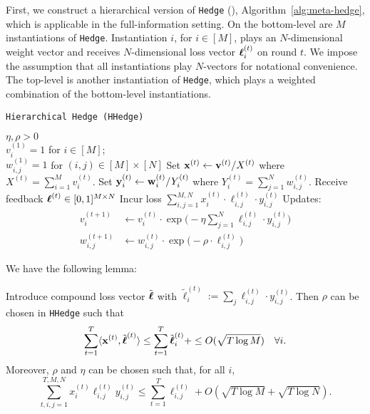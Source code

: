 First, we construct a hierarchical version of \texttt{Hedge} (\cite{chang:05}), Algorithm~\ref{alg:meta-hedge}, which is applicable in the full-information setting. On the bottom-level are $M$ instantiations of \texttt{Hedge}. Instantiation $i$, for $i\in[M]$, plays an $N$-dimensional weight vector and receives $N$-dimensional loss vector $\boldsymbol\ell^{(t)}_{i}$ on round $t$. We impose the assumption that all instantiations play $N$-vectors for notational convenience. The top-level is another instantiation of \texttt{Hedge}, which plays a weighted combination of the bottom-level instantiations.

\begin{algorithm}
   \caption{\texttt{Hierarchical Hedge (HHedge)}}
   \label{alg:meta-hedge}
   \begin{algorithmic}   
   	 $\eta,\rho>0$\\
   	 $v^{(1)}_{i}=1$ for $i\in[M]$;\\ 
   	 $w^{(1)}_{i,j}=1$ for $(i,j)\in[M]\times[N]$
	\STATE Set ${\mathbf x}^{(t)} \leftarrow {\mathbf v}^{(t)}/X^{(t)}$ where $X^{(t)} = \sum_{i=1}^M v^{(t)}_{i}$.
	\STATE Set ${\mathbf y}^{(t)}_{i} \leftarrow {\mathbf w}^{(t)}_{i}/Y^{(t)}_{i}$ where $Y^{(t)}_{i} = \sum_{j=1}^N w^{(t)}_{i,j}$.
	\STATE Receive feedback $\boldsymbol\ell^{(t)}\in [0,1]^{M\times N}$ 
	\STATE Incur loss $\sum_{i,j=1}^{M,N} x^{(t)}_{i}\cdot\ell^{(t)}_{i,j}\cdot y^{(t)}_{i,j}$
	\STATE Updates:
	\begin{align}
		v^{(t+1)}_i & \leftarrow v^{(t)}_{i}\cdot \exp\big(-\eta \sum_{j=1}^N\ell^{(t)}_{i,j}\cdot y^{(t)}_{i,j}\big)
		\\
		w^{(t+1)}_{i,j} & \leftarrow w^{(t)}_{i,j}\cdot \exp\big(-\rho\cdot \ell^{(t)}_{i,j}\big)
	\end{align}
   	\ENDFOR
   	\end{algorithmic}
\end{algorithm} %

We have the following lemma:

\begin{lem}\label{lem:meta-hedge}
	Introduce compound loss vector $\tilde{\boldsymbol\ell}$ with $\tilde{\ell}^{(t)}_i := \sum_j \ell^{(t)}_{i,j}\cdot y^{(t)}_{i,j}$. Then $\rho$ can be chosen in \texttt{HHedge} such that
	\begin{equation}
		\sum_{t=1}^T \langle {\mathbf x}^{(t)},\tilde{\boldsymbol\ell}^{(t)}\rangle 
		\leq  \sum_{t=1}^T \tilde{\boldsymbol\ell}^{(t)}_i +
		\leq O(\sqrt{T \log M})\quad\forall i.
	\end{equation} %
	Moreover, $\rho$ and $\eta$ can be chosen such that, for all $i$,
	\begin{equation}
		\sum_{t,i,j=1}^{T,M,N} x^{(t)}_{i}\ell^{(t)}_{i,j} y^{(t)}_{i,j}
		\leq \sum_{t=1}^T\ell^{(t)}_{i,j}
		+ O(\sqrt{T \log M} + \sqrt{T \log N}).
	\end{equation}
\end{lem}

